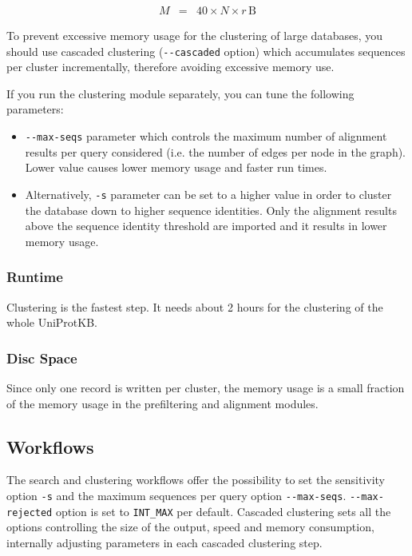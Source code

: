 \documentclass[11pt,a4paper]{scrreprt}
\begin{document}
\begin{eqnarray*}
M & = & 40\times N\times r\,\mathrm{B}
\end{eqnarray*}
 
To prevent excessive memory usage for the clustering of large databases, you should use cascaded clustering (\texttt{-{}-cascaded} option) which accumulates sequences per cluster incrementally, therefore avoiding excessive memory use.

If you run the clustering module separately, you can tune the following parameters:
\begin{itemize}
\item \texttt{-{}-max-seqs} parameter which controls the maximum number of alignment results per query considered (i.e. the number of edges per node in the graph). Lower value causes lower memory usage and faster run times.
\item Alternatively, \texttt{-s} parameter can be set to a higher value in order to cluster the database down to higher sequence identities. Only the alignment results above the sequence identity threshold are imported and it results in lower memory usage. 
\end{itemize}
\subsubsection{Runtime}
Clustering is the fastest step. It needs about 2 hours for the clustering of the whole UniProtKB. 
\subsubsection{Disc Space}
Since only one record is written per cluster, the memory usage is a small fraction of the memory usage in the prefiltering and alignment modules.
\subsection{Workflows}
The search and clustering workflows offer the possibility to set the sensitivity option \texttt{-s} and the maximum sequences per query option \texttt{-{}-max-seqs}. \texttt{-{}-max-rejected} option is set to \texttt{INT\_MAX} per default. Cascaded clustering sets all the options controlling the size of the output, speed and memory consumption, internally adjusting parameters in each cascaded clustering step.
\end{document}
